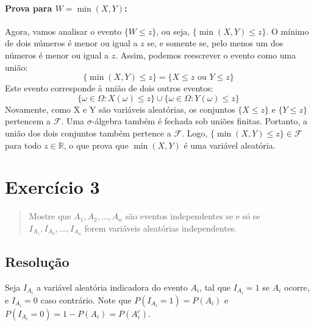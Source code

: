 \documentclass[12pt]{article}
\begin{document}
\paragraph{Prova para $W = \min(X,Y)$:}
Agora, vamos analisar o evento $\{W \le z\}$, ou seja, $\{\min(X,Y) \le z\}$.
O mínimo de dois números é menor ou igual a $z$ se, e somente se, pelo menos um dos números é menor ou igual a $z$. Assim, podemos reescrever o evento como uma união:
\[ \{\min(X,Y) \le z\} = \{X \le z \text{ ou } Y \le z\} \]
Este evento corresponde à união de dois outros eventos:
\[ \{\omega \in \Omega : X(\omega) \le z\} \cup \{\omega \in \Omega : Y(\omega) \le z\} \]
Novamente, como X e Y são variáveis aleatórias, os conjuntos $\{X \le z\}$ e $\{Y \le z\}$ pertencem a $\mathcal{F}$.
Uma $\sigma$-álgebra também é fechada sob uniões finitas. Portanto, a união dos dois conjuntos também pertence a $\mathcal{F}$.
Logo, $\{\min(X,Y) \le z\} \in \mathcal{F}$ para todo $z \in \mathbb{R}$, o que prova que $\min(X,Y)$ é uma variável aleatória.
\hfill \qedsymbol

\pagebreak

\section{Exercício 3}

\begin{quote}
Mostre que $A_1, A_2, \dots, A_n$ são eventos independentes se e só se $I_{A_1}, I_{A_2}, \dots, I_{A_n}$ forem variáveis aleatórias independentes.
\end{quote}

\subsection*{Resolução}
Seja $I_{A_i}$ a variável aleatória indicadora do evento $A_i$, tal que $I_{A_i}=1$ se $A_i$ ocorre, e $I_{A_i}=0$ caso contrário. Note que $P(I_{A_i}=1) = P(A_i)$ e $P(I_{A_i}=0) = 1 - P(A_i) = P(A_i^c)$.
\end{document}
